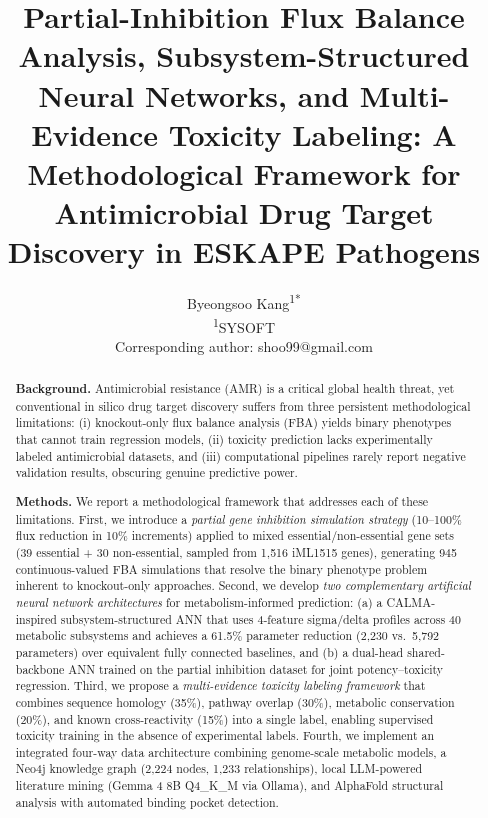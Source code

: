 \documentclass[12pt,a4paper]{article}
\title{Partial-Inhibition Flux Balance Analysis, Subsystem-Structured Neural Networks, and Multi-Evidence Toxicity Labeling: A Methodological Framework for Antimicrobial Drug Target Discovery in ESKAPE Pathogens}
\author{
Byeongsoo Kang\textsuperscript{1*}\\
\small\textsuperscript{1}SYSOFT\\
\small *Corresponding author: shoo99@gmail.com
}
\date{}
\begin{document}
\maketitle

\begin{abstract}
\textbf{Background.} Antimicrobial resistance (AMR) is a critical global health threat, yet conventional in silico drug target discovery suffers from three persistent methodological limitations: (i) knockout-only flux balance analysis (FBA) yields binary phenotypes that cannot train regression models, (ii) toxicity prediction lacks experimentally labeled antimicrobial datasets, and (iii) computational pipelines rarely report negative validation results, obscuring genuine predictive power.

\textbf{Methods.} We report a methodological framework that addresses each of these limitations. First, we introduce a \textit{partial gene inhibition simulation strategy} (10--100\% flux reduction in 10\% increments) applied to mixed essential/non-essential gene sets (39 essential + 30 non-essential, sampled from 1,516 iML1515 genes), generating 945 continuous-valued FBA simulations that resolve the binary phenotype problem inherent to knockout-only approaches. Second, we develop \textit{two complementary artificial neural network architectures} for metabolism-informed prediction: (a) a CALMA-inspired subsystem-structured ANN that uses 4-feature sigma/delta profiles across 40 metabolic subsystems and achieves a 61.5\% parameter reduction (2,230 vs.\ 5,792 parameters) over equivalent fully connected baselines, and (b) a dual-head shared-backbone ANN trained on the partial inhibition dataset for joint potency--toxicity regression. Third, we propose a \textit{multi-evidence toxicity labeling framework} that combines sequence homology (35\%), pathway overlap (30\%), metabolic conservation (20\%), and known cross-reactivity (15\%) into a single label, enabling supervised toxicity training in the absence of experimental labels. Fourth, we implement an integrated four-way data architecture combining genome-scale metabolic models, a Neo4j knowledge graph (2,224 nodes, 1,233 relationships), local LLM-powered literature mining (Gemma 4 8B Q4\_K\_M via Ollama), and AlphaFold structural analysis with automated binding pocket detection.


\end{abstract}
\end{document}
